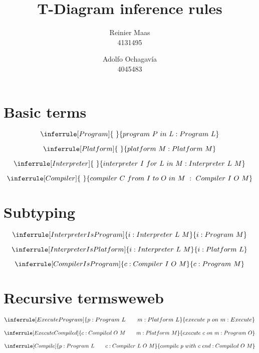 \documentclass{article}
\author{
  Reinier Maas \\ 4131495
  \and
  Adolfo Ochagavía \\ 4045483
}
\title{T-Diagram inference rules}
\begin{document}
\maketitle


\section*{Basic terms}

\[
\inferrule[Program]{\ }{program\ P\ in\ L : Program\ L}
\]

\[
\inferrule[Platform]{\ }{platform\ M : Platform\ M}
\]

\[
\inferrule[Interpreter]{\ }{interpreter\ I\ for\ L\ in\ M : Interpreter\ L\ M}
\]

\[
\inferrule[Compiler]{\ }{compiler\ C\ from\ I\ to\ O\ in\ M\ :\ Compiler\ I\ O\ M}
\]

\section*{Subtyping}

\[
\inferrule[InterpreterIsProgram]{i : Interpreter\ L\ M}{i : Program\ M}
\]

\[
\inferrule[InterpreterIsPlatform]{i : Interpreter\ L\ M}{i : Platform\ L}
\]

\[
\inferrule[CompilerIsProgram]{c : Compiler\ I\ O\ M}{c : Program\ M}
\]

\section*{Recursive termsweweb}

\[
\inferrule[ExecuteProgram]{p : Program\ L \qquad m : Platform\ L}{execute\ p\ on\ m : Execute}
\]

\[
\inferrule[ExecuteCompiled]{c : Compiled\ O\ M \qquad m : Platform\ M}{execute\ c\ on\ m : Program\ O}
\]

\[
\inferrule[Compile]{p : Program\ L \qquad c : Compiler\ L\ O\ M}{compile\ p\ with\ c\ end : Compiled\ O\ M}
\]
\end{document}
